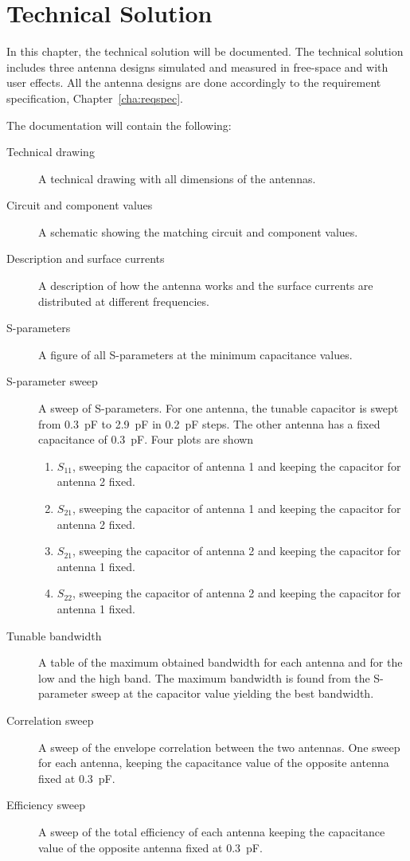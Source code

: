 \chapter{Technical Solution}
\label{cha:nousersim}
In this chapter, the technical solution will be documented. The technical solution includes three antenna designs simulated and measured in free-space and with user effects. All the antenna designs are done accordingly to the requirement specification, Chapter~\ref{cha:reqspec}. 

The documentation will contain the following:
\begin{description}
\item[Technical drawing] A technical drawing with all dimensions of the antennas. 
\item[Circuit and component values] A schematic showing the matching circuit and component values.
\item[Description and surface currents] A description of how the antenna works and the surface currents are distributed at different frequencies.
\item[S-parameters] A figure of all S-parameters at the minimum capacitance values.
\item[S-parameter sweep] A sweep of S-parameters. For one antenna, the tunable capacitor is swept from \SI{0.3}{pF} to \SI{2.9}{pF} in \SI{0.2}{pF} steps. The other antenna has a fixed capacitance of \SI{0.3}{pF}. Four plots are shown
    \begin{enumerate}
    \item $S_{11}$, sweeping the capacitor of antenna 1 and keeping the capacitor for antenna 2 fixed.
    \item $S_{21}$, sweeping the capacitor of antenna 1 and keeping the capacitor for antenna 2 fixed.
    \item $S_{21}$, sweeping the capacitor of antenna 2 and keeping the capacitor for antenna 1 fixed.
    \item $S_{22}$, sweeping the capacitor of antenna 2 and keeping the capacitor for antenna 1 fixed.
    \end{enumerate}
\item[Tunable bandwidth] A table of the maximum obtained bandwidth for each antenna and for the low and the high band. The maximum bandwidth is found from the S-parameter sweep at the capacitor value yielding the best bandwidth.
\item[Correlation sweep] A sweep of the envelope correlation between the two antennas. One sweep for each antenna, keeping the capacitance value of the opposite antenna fixed at \SI{0.3}{pF}.
\item[Efficiency sweep] A sweep of the total efficiency of each antenna keeping the capacitance value of the opposite antenna fixed at \SI{0.3}{pF}.
\end{description}
